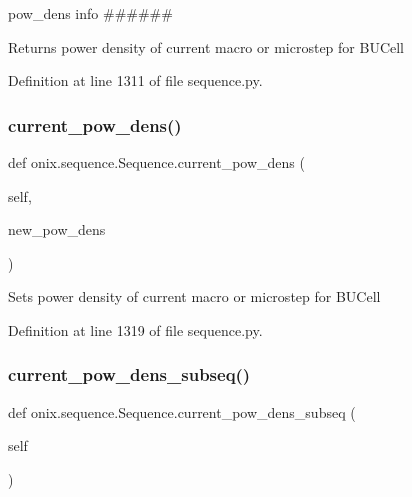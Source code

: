 pow\+\_\+dens info \#\#\#\#\#\# 

\begin{DoxyVerb}Returns power density of current macro or microstep
for BUCell\end{DoxyVerb}
 

Definition at line 1311 of file sequence.\+py.

\mbox{\label{classonix_1_1sequence_1_1Sequence_aceee0aa2f455aa8b86c82b8dc485832d}} 
\subsubsection{\texorpdfstring{current\+\_\+pow\+\_\+dens()}{current\_pow\_dens()}\hspace{0.1cm}{\footnotesize\ttfamily [2/2]}}
{\footnotesize\ttfamily def onix.\+sequence.\+Sequence.\+current\+\_\+pow\+\_\+dens (\begin{DoxyParamCaption}\item[{}]{self,  }\item[{}]{new\+\_\+pow\+\_\+dens }\end{DoxyParamCaption})}

\begin{DoxyVerb}Sets power density of current macro or microstep
for BUCell\end{DoxyVerb}
 

Definition at line 1319 of file sequence.\+py.

\mbox{\label{classonix_1_1sequence_1_1Sequence_a0a07c1fd565dc9e5d1e1875fedb6ee1f}} 
\subsubsection{\texorpdfstring{current\+\_\+pow\+\_\+dens\+\_\+subseq()}{current\_pow\_dens\_subseq()}}
{\footnotesize\ttfamily def onix.\+sequence.\+Sequence.\+current\+\_\+pow\+\_\+dens\+\_\+subseq (\begin{DoxyParamCaption}\item[{}]{self }\end{DoxyParamCaption})}

